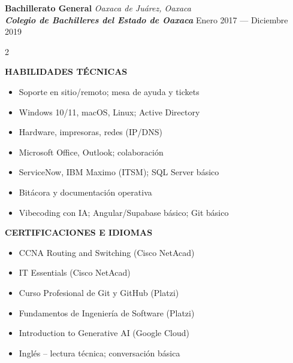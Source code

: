 \documentclass[10pt,letterpaper]{article}
\newcommand{\entry}[4]{
  \begin{minipage}[t]{\linewidth}
    \textbf{#1} \hfill \textit{#2} \\
    \textbf{\textit{#3}} \hfill #4
  \end{minipage}
}
\begin{document}
\entry
{Bachillerato General}
{Oaxaca de Juárez, Oaxaca}
{Colegio de Bachilleres del Estado de Oaxaca}
{Enero 2017 --- Diciembre 2019}

\begin{multicols}{2}

	\textbf{\MakeUppercase{Habilidades técnicas}}
	\begin{itemize}
		\item Soporte en sitio/remoto; mesa de ayuda y tickets
		\item Windows 10/11, macOS, Linux; Active Directory
		\item Hardware, impresoras, redes (IP/DNS)
		\item Microsoft Office, Outlook; colaboración
		\item ServiceNow, IBM Maximo (ITSM); SQL Server básico
		\item Bitácora y documentación operativa
		\item Vibecoding con IA; Angular/Supabase básico; Git básico
	\end{itemize}

	\columnbreak

	\textbf{\MakeUppercase{Certificaciones e idiomas}}
	\begin{itemize}
		\item CCNA Routing and Switching (Cisco NetAcad)
		\item IT Essentials (Cisco NetAcad)
		\item Curso Profesional de Git y GitHub (Platzi)
		\item Fundamentos de Ingeniería de Software (Platzi)
		\item Introduction to Generative AI (Google Cloud)
		\item Inglés – lectura técnica; conversación básica
	\end{itemize}

\end{multicols}
\end{document}
